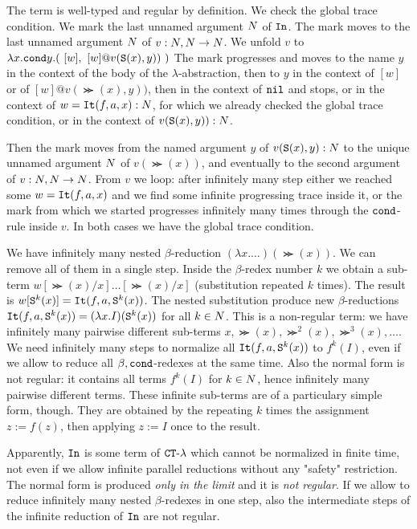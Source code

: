 \documentclass{article}
\begin{document}
The term is well-typed and regular by definition. We check the global trace condition.
We mark the last unnamed argument ${N}$ of ${\tt In}$.
The mark moves to the last unnamed argument ${N}$ of  
$v:{N},{N} \rightarrow {N}$. 
We unfold $v$ to $\lambda x.{\tt cond} y. 
(\ [w],  \  [w] @ v({\tt S} (x),y)) \ )$
The mark progresses and moves to the name $y$ in the context of the body of the $\lambda$-abstraction,
then to $y$ in the context of $[w]$ or of $ [w] @ v(\Succ (x),y))$,
then in the context of ${\tt nil}$ and stops, or in the context of $w={\tt It}(f,a,x):{N}$, 
for which we already checked the global trace condition, or in the context of $v({\tt S} (x),y)):{N}$. 

Then the mark moves from the named argument $y$ of $v({\tt S} (x),y):{N}$ to the unique 
unnamed argument ${N}$ of $v(\Succ (x))$, 
and eventually to the second argument of $v:{N},{N}\rightarrow {N}$. 
From $v$ we loop: after infinitely many step either we reached some $w={\tt It}(f,a,x)$ 
and we find some infinite progressing trace inside it, or the
mark from which we started progresses infinitely many times through the ${\tt cond}$-rule inside $v$. 
In both cases we have the global trace condition.

We have infinitely many nested $\beta$-reduction $(\lambda x. \ldots)(\Succ (x))$.
We can remove all of them in a single step. Inside the $\beta$-redex number $k$ we obtain a sub-term
$w[\Succ (x)/x]\ldots[\Succ (x)/x]$ (substitution repeated $k$ times).
The result is $w[{\tt S} ^k(x)] = {\tt It}(f,a,{\tt S} ^k(x))$.
The nested substitution produce new $\beta$-reductions 
${\tt It}(f,a,{\tt S} ^k(x)) = (\lambda x.I)({\tt S} ^k(x))$ for all $k \in {N}$.
This is a non-regular term: we have infinitely many pairwise different 
sub-terms $x,\Succ (x),\Succ^2(x), \Succ^3(x), \ldots$.
We need infinitely many steps to normalize all ${\tt It}(f,a,{\tt S}^k(x))$ to $f^k(I)$, 
even if we allow to reduce all $\beta,{\tt cond}$-redexes at the same time.
Also the normal form is not regular: it contains all terms $f^k(I)$ for $k \in {N}$, hence
infinitely many pairwise different terms. These infinite sub-terms are of a particulary simple form, though. 
They are obtained by the repeating $k$ times the assignment $z:=f(z)$, then applying $z:=I$ once
to the result.

Apparently, ${\tt In}$  
is some term of ${ {\tt CT} \mbox{-} \lambda}$ which cannot be normalized in finite time, not even if we allow
infinite parallel reductions without any "safety" restriction. 
The normal form is produced \emph{only in the limit}
and it is \emph{not regular}. If we allow to reduce infinitely many nested $\beta$-redexes in one step, also
the intermediate steps of the infinite reduction of ${\tt In}$ are not regular.
\end{document}
